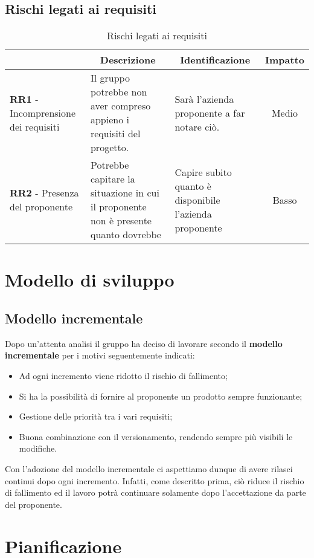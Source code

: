 \subsection{Rischi legati ai requisiti} \label{subsection:rischi_legati_ai_requisiti}
\begin{table}[H]
    \centering
    \renewcommand{\arraystretch}{1.8}
    \begin{tabular}{p{5.5cm}|p{5cm}|p{5cm}|c}
        \rowcolor[HTML]{1F85DE}
        \multicolumn{1}{c}{\color[HTML]{FFFFFF}\textbf{Codice}}
        & \multicolumn{1}{c}{\color[HTML]{FFFFFF}\textbf{Descrizione}}
        & \multicolumn{1}{c}{\color[HTML]{FFFFFF}\textbf{Identificazione}}
        & \color[HTML]{FFFFFF}\textbf{Impatto}\\
        \hline
        \textbf{RR1} - Incomprensione dei requisiti & Il gruppo potrebbe non aver compreso appieno i requisiti del progetto. & Sarà l'azienda proponente a far notare ciò. & Medio \\
        \textbf{RR2} - Presenza del proponente & Potrebbe capitare la situazione in cui il proponente non è presente quanto dovrebbe & Capire subito quanto è disponibile l'azienda proponente & Basso
    \end{tabular}
   \caption{Rischi legati ai requisiti}
\end{table}

\section{Modello di sviluppo}
\subsection{Modello incrementale} %
Dopo un'attenta analisi il gruppo ha deciso di lavorare secondo il \textbf{modello incrementale} per i motivi seguentemente indicati:
\begin{itemize}
    \item Ad ogni incremento viene ridotto il rischio di fallimento;
    \item Si ha la possibilità di fornire al proponente un prodotto sempre funzionante;
    \item Gestione delle priorità tra i vari requisiti;
    \item Buona combinazione con il versionamento, rendendo sempre più visibili le modifiche.
\end{itemize}
Con l'adozione del modello incrementale ci aspettiamo dunque di avere rilasci continui dopo ogni incremento. Infatti, come descritto prima, ciò riduce il rischio di fallimento ed il lavoro potrà continuare solamente dopo l'accettazione
da parte del proponente.
\section{Pianificazione}
